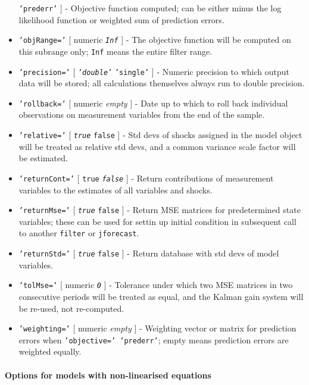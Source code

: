 \begin{itemize}
   \texttt{'prederr'} {]} - Objective function computed; can be either
   minus the log likelihood function or weighted sum of prediction
   errors.
 \item
   \texttt{'objRange='} {[} numeric \textbar{} \emph{\texttt{Inf}} {]} -
   The objective function will be computed on this subrange only;
   \texttt{Inf} means the entire filter range.
 \item
   \texttt{'precision='} {[} \emph{\texttt{'double'}} \textbar{}
   \texttt{'single'} {]} - Numeric precision to which output data will be
   stored; all calculations themselves always run to double precision.
 \item
   \texttt{'rollback='} {[} numeric \textbar{} \emph{empty} {]} - Date up
   to which to roll back individual observations on measurement variables
   from the end of the sample.
 \item
   \texttt{'relative='} {[} \emph{\texttt{true}} \textbar{}
   \texttt{false} {]} - Std devs of shocks assigned in the model object
   will be treated as relative std devs, and a common variance scale
   factor will be estimated.
 \item
   \texttt{'returnCont='} {[} \texttt{true} \textbar{}
   \emph{\texttt{false}} {]} - Return contributions of measurement
   variables to the estimates of all variables and shocks.
 \item
   \texttt{'returnMse='} {[} \emph{\texttt{true}} \textbar{}
   \texttt{false} {]} - Return MSE matrices for predetermined state
   variables; these can be used for settin up initial condition in
   subsequent call to another \texttt{filter} or \texttt{jforecast}.
 \item
   \texttt{'returnStd='} {[} \emph{\texttt{true}} \textbar{}
   \texttt{false} {]} - Return database with std devs of model variables.
 \item
   \texttt{'tolMse='} {[} numeric \textbar{} \emph{\texttt{0}} {]} -
   Tolerance under which two MSE matrices in two consecutive periods will
   be treated as equal, and the Kalman gain system will be re-used, not
   re-computed.
 \item
   \texttt{'weighting='} {[} numeric \textbar{} \emph{empty} {]} -
   Weighting vector or matrix for prediction errors when
   \texttt{'objective=' 'prederr'}; empty means prediction errors are
   weighted equally.
 \end{itemize}
 
 \paragraph{Options for models with non-linearised equations}
 
